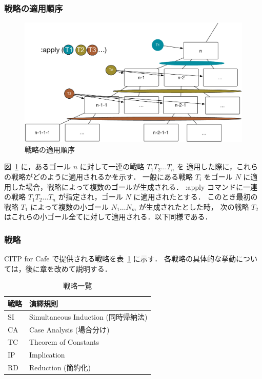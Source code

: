 \documentclass[a4paper,oneside,10pt,here]{memoir}
\begin{document}
\subsubsection{戦略の適用順序}

\begin{figure}[htbp]
\begin{center}
  \includegraphics[scale=0.4]{apply-order.pdf}
\end{center}
\caption{戦略の適用順序}
\label{fig:apply-tactic}
\end{figure}
図~\ref{fig:apply-tactic} に，あるゴール $n$ に対して一連の戦略 $T_1 T_2 \ldots T_n$ を
適用した際に，これらの戦略がどのように適用されるかを示す．
一般にある戦略 $T_i$ をゴール $N$ に適用した場合，戦略によって複数のゴールが生成される．
:apply コマンドに一連の戦略 $T_1 T_2 \ldots T_n$ が指定され，ゴール $N$ に適用されたとする．
このとき最初の戦略 $T_1$ によって複数の小ゴール $N_1 \ldots N_m$ が生成されたとした時，
次の戦略 $T_2$ はこれらの小ゴール全てに対して適用される．以下同様である．

\subsubsection{戦略}
CITP for Cafe で提供される戦略を表~\ref{tab:tactics} に示す．
各戦略の具体的な挙動については，後に章を改めて説明する．

\begin{table}
\label{tab:tactics}
\caption{戦略一覧}
\begin{center}
\begin{tabular}[tbhp]{|l|l|}\hline
戦略 & 演繹規則 \\\hline\hline
SI & Simultaneous Induction (同時帰納法) \\\hline
CA & Case Analysis (場合分け)\\\hline
TC & Theorem of Constants  \\\hline
IP & Implication \\\hline
RD & Reduction (簡約化) \\\hline
\end{tabular}
\end{center}
\end{table}
\end{document}
